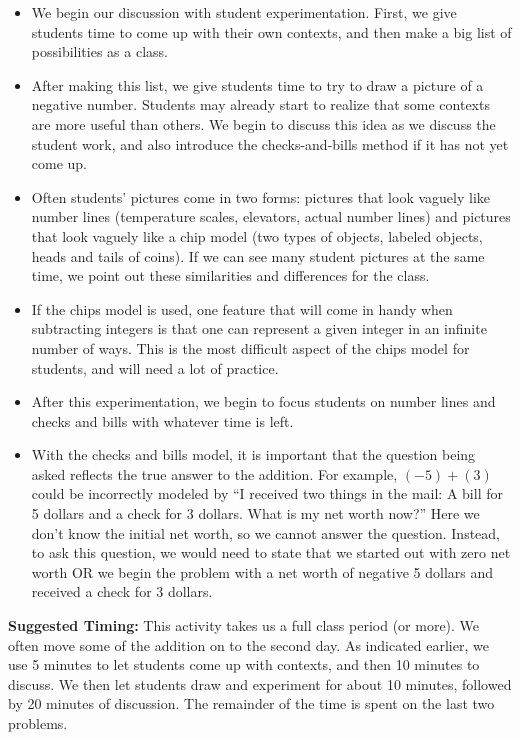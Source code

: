 \documentclass[ nooutcomes,noauthor]{ximera}
\begin{document}
\begin{instructorNotes}
\begin{itemize}
    \item We begin our discussion with student experimentation.  First, we give students time to come up with their own contexts, and then make a big list of possibilities as a class.
    \item After making this list, we give students time to try to draw a picture of a negative number.  Students may already start to realize that some contexts are more useful than others.  We begin to discuss this idea as we discuss the student work, and also introduce the checks-and-bills method if it has not yet come up.
    \item Often students' pictures come in two forms: pictures that look vaguely like number lines (temperature scales, elevators, actual number lines) and pictures that look vaguely like a chip model (two types of objects, labeled objects, heads and tails of coins).  If we can see many student pictures at the same time, we point out these similarities and differences for the class.
    \item  If the chips model is used, one feature that will come in handy when subtracting integers is that one can represent a given integer in an infinite number of ways. This is the most difficult aspect of the chips model for students, and will need a lot of practice.
    \item After this experimentation, we begin to focus students on number lines and checks and bills with whatever time is left.
    \item  With the checks and bills model, it is important that the question being asked reflects the true answer to the addition.  For example, $(-5) + (3)$ could be incorrectly modeled by ``I received two things in the mail: A bill for 5 dollars and a check for 3 dollars.  What is my net worth now?''  Here we don't know the initial net worth, so we cannot answer the question.  Instead, to ask this question, we would need to state that we started out with zero net worth OR we begin the problem with a net worth of negative 5 dollars and received a check for 3 dollars.
\end{itemize}

{\bf Suggested Timing:} This activity takes us a full class period (or more).  We often move some of the addition on to the second day.  As indicated earlier, we use 5 minutes to let students come up with contexts, and then 10 minutes to discuss.  We then let students draw and experiment for about 10 minutes, followed by 20 minutes of discussion.  The remainder of the time is spent on the last two problems.
\end{instructorNotes}
\end{document}
